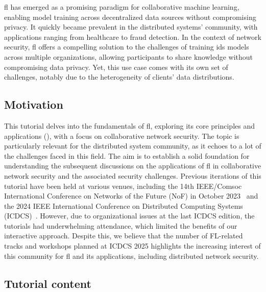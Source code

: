 \documentclass[conference]{IEEEtran}
\begin{document}
\gls{fl} has emerged as a promising paradigm for collaborative machine learning, enabling model training across decentralized data sources without compromising privacy.
It quickly became prevalent in the distributed systems' community, with applications ranging from healthcare to fraud detection.
In the context of network security, \gls{fl} offers a compelling solution to the challenges of training \gls{ids} models across multiple organizations, allowing participants to share knowledge without compromising data privacy.
Yet, this use case comes with its own set of challenges, notably due to the heterogeneity of clients' data distributions.

\subsection{Motivation}

This tutorial delves into the fundamentals of \gls{fl}, exploring its core principles and applications (), with a focus on collaborative network security.
The topic is particularly relevant for the distributed system community, as it echoes to a lot of the challenges faced in this field.
The aim is to establish a solid foundation for understanding the subsequent discussions on the applications of \gls{fl} in collaborative network security and the associated security challenges.
Previous iterations of this tutorial have been held at various venues, including the 14th IEEE/Comsoc International Conference on Networks of the Future (NoF) in October 2023~\cite{lavaur_nof_tuto_2023} and the 2024 IEEE International Conference on Distributed Computing Systems (ICDCS)~\cite{lavaur_icdcs_tuto_2024}.
However, due to organizational issues at the last ICDCS edition, the tutorials had underwhelming attendance, which limited the benefits of our interactive approach.
Despite this, we believe that the number of FL-related tracks and workshops planned at ICDCS 2025 highlights the increasing interest of this community for \gls{fl} and its applications, including distributed network security.

\subsection{Tutorial content}
\end{document}
